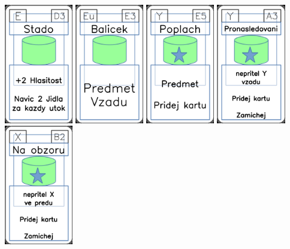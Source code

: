 \documentclass[a4paper]{article}
\begin{document}
	\includegraphics[width=3.0cm]{img-4_47}
	\includegraphics[width=3.0cm]{img-4_22}
	\includegraphics[width=3.0cm]{img-5_24}
	\includegraphics[width=3.0cm]{img-5_32}
	\includegraphics[width=3.0cm]{img-5_6}
\end{document}
